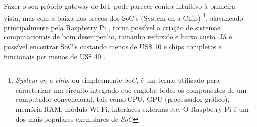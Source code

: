 Fazer o seu próprio gateway de IoT pode parecer contra-intuitivo à primeira vista, mas com a baixa nos preços dos SoC’s (System-on-a-Chip) \footnote{\textit{System-on-a-chip}, ou simplesmente \textit{SoC}, é um termo utilizado para caracterizar um circuito integrado que engloba todos os componentes de um computador convencional, tais como CPU, GPU (processador gráfico), memória RAM, módulo Wi-Fi, interfaces externas etc. O Raspberry Pi é um dos mais populares exemplares de \textit{SoC}}, alavancado principalmente pela Raspberry Pi \cite{RaspberryPi}, torna possível a criação de sistemas computacionais de bom desempenho, tamanho reduzido e baixo custo. Já é possível encontrar SoC’s custando menos de US\$ 10 e chips completos e funcionais por menos de US\$ 40 \cite{RaspberryPiVenda}.